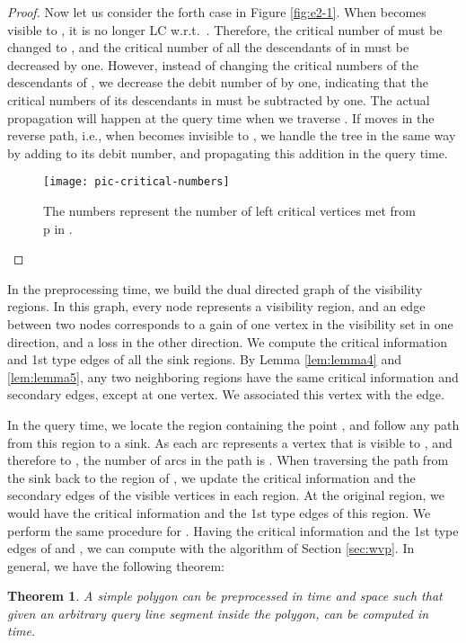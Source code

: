 \documentclass[5p]{elsarticle}
\newtheorem{theorem}{Theorem}
\begin{document}
\begin{proof}
Now let us consider the forth case in Figure \ref{fig:e2-1}. When  becomes visible to ,
it is no longer LC w.r.t.\ . Therefore, the critical number of  must be changed to ,
and the critical number of all the descendants of  in  must be decreased by one.
However, instead of changing the critical numbers of the descendants of , 
we decrease the debit number of  by one, indicating that the critical numbers of 
its descendants in  must be subtracted by one. The actual propagation 
will happen at the query time when we traverse . 
If  moves in the reverse path, i.e., when  becomes 
invisible to , we handle the tree in the same way by adding
 to its debit number, and propagating this addition in
the query time.

\begin{figure}[h]
  \centering
  \texttt{[image: pic-critical-numbers]}  
  \caption{
The numbers represent the number of left critical vertices met from p in .}
  \label{fig:critical-numbers}
\end{figure}
\end{proof}


In the preprocessing time, we build the dual directed graph of the visibility 
regions. In this graph, every node represents a visibility 
region, and an edge between two nodes corresponds to a gain of one vertex 
in the visibility set in one direction, and a loss in the other direction.
We compute the critical information and 1st type edges of all 
the sink regions. By Lemma \ref{lem:lemma4} and \ref{lem:lemma5}, any two neighboring regions
have the same critical information and secondary edges, except at one vertex. 
We associated this vertex with the edge. 

In the query time, we locate the region containing the point , and follow any path 
from this region to a sink. As each arc represents a vertex that is visible to
, and therefore to , the number of arcs in the path is 
. When traversing the path from the sink back to the region of , 
we update the critical information and the secondary edges of the visible vertices 
in each region. At the original region, we would have the critical information
and the 1st type edges of this region. 
We perform the same procedure for .
Having the critical information and the 1st type edges of  and , we can 
compute  with the algorithm of Section \ref{sec:wvp}. 
In general, we have the following theorem:

\begin{theorem}
\label{theom:weak_in_simple}
A simple polygon  can be preprocessed in  time and  space such
that given an arbitrary query line segment inside the polygon, 
 can be computed in  time.
\end{theorem}
\end{document}
